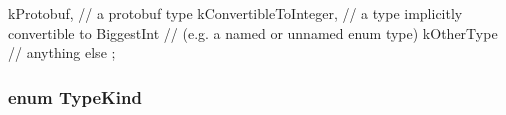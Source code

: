 \begin{DoxyCode}
              {
  kProtobuf,              // a protobuf type
  kConvertibleToInteger,  // a type implicitly convertible to BiggestInt
                          // (e.g. a named or unnamed enum type)
  kOtherType              // anything else
};
\end{DoxyCode}
\hypertarget{namespacetesting_1_1internal2_ab4dd8308e08805aedfe646096be0e4e7}{
\subsubsection[{\-Type\-Kind}]{\setlength{\rightskip}{0pt plus 5cm}enum {\bf \-Type\-Kind}}}\label{da/df7/namespacetesting_1_1internal2_ab4dd8308e08805aedfe646096be0e4e7}
